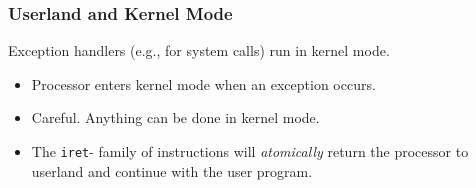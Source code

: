 \begin{frame}

\frametitle{Userland and Kernel Mode}

\vspace{\fill}

\begin{center}

Exception handlers (e.g., for system calls) run in kernel mode.

\end{center}

\vspace{\fill}

\begin{itemize}

\item Processor enters kernel mode when an exception occurs.

\item Careful. Anything can be done in kernel mode.

\item The \texttt{iret}- family of instructions will \emph{atomically} return
the processor to userland and continue with the user program.

\end{itemize}

\end{frame}
